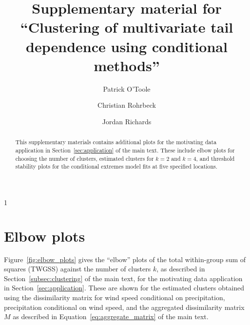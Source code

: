 \documentclass[preprint,12pt,authoryear]{elsarticle}
\newcommand{\blind}{1}
\begin{document}
\def\spacingset#1{\renewcommand{\baselinestretch}%
{#1}\small\normalsize} \spacingset{1}


\begin{frontmatter}


\title{\bf Supplementary material for ``Clustering of multivariate tail dependence using conditional methods''}

\blind
  \author{Patrick O'Toole}
  \address{Department of Mathematical Sciences, University of Bath, UK}
  \author{Christian Rohrbeck}
  \address{Department of Mathematical Sciences, University of Bath, UK}
  \author{Jordan Richards}
  \address{School of Mathematics and Maxwell Institute for Mathematical Sciences, University of Edinburgh, UK}
\else 
  \author{}
  \address{}
\fi

\begin{abstract}
  This supplementary materials contains additional plots for the motivating data application in Section~\ref{sec:application} of the main text.
  These include elbow plots for choosing the number of clusters, estimated clusters for $k=2$ and $k=4$, and threshold stability plots for the conditional extremes model fits at five specified locations.
\end{abstract}

\end{frontmatter}

\newpage
\spacingset{1.75} %

\setlength{\textfloatsep}{10pt plus 1pt minus 2pt}
\setlength{\intextsep}{8pt plus 1pt minus 2pt}
\setlength{\floatsep}{8pt plus 1pt minus 2pt}

\setlength{\abovedisplayskip}{8pt plus 2pt minus 4pt}
\setlength{\belowdisplayskip}{8pt plus 2pt minus 4pt}
\setlength{\abovedisplayshortskip}{4pt plus 2pt minus 4pt}
\setlength{\belowdisplayshortskip}{4pt plus 2pt minus 4pt}

\section{Elbow plots}

Figure~\ref{fig:elbow_plots} gives the ``elbow'' plots of the total within-group sum of squares (TWGSS) against the number of clusters $k$, as described in Section~\ref{subsec:clustering} of the main text, for the motivating data application in Section~\ref{sec:application}.
These are shown for the estimated clusters obtained using the dissimilarity matrix for wind speed conditional on precipitation, precipitation conditional on wind speed, and the aggregated dissimilarity matrix $M$ as described in Equation~\eqref{eq:aggregate_matrix} of the main text.
\end{document}
